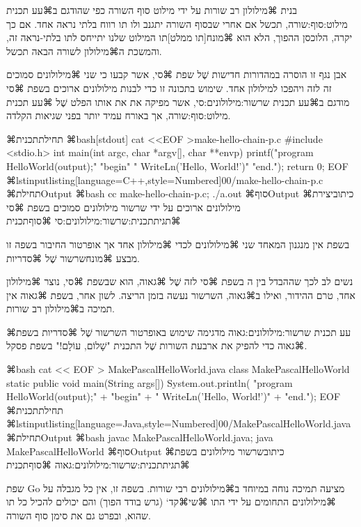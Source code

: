 בנית ⌘מילולון רב שורות על ידי מילוט סוף השורה כפי שהודגם ב⌘עע תכנית
מילוט:סוף:שורה, תכשל אם אחרי  שבסוף השורה יתגנב ולו
תו רווח בלתי נראה אחד. אם כך יקרה, הלוכסן ההפוך, הלא הוא
⌘מונח[תו ממלט]{תו המילוט} שלנו יתייחס לתו בלתי-נראה זה,
והמשכת ה⌘מילולון לשורה הבאה תכשל.

אבן נגף זו הוסרה במהדורות חדישות שֶׁל שפת ⌘סי, אשר קבעו כי שני ⌘מילולונים סמוכים
 זה לזה ויהפכו למילולון אחד. שימוש בתכונה זו כדי לבנות
מילולונים ארוכים בשפת ⌘סי מודגם ב⌘עע תכנית שרשור:מילולונים:סי, אשר מפיקה את
את אותו הפלט שֶׁל ⌘עע תכנית מילוט:סוף:שורה, אך באורח עמיד יותר בפני שגיאות הקלדה.

⌘תחילת{תכנית}
⌘bash[stdout]
cat <<EOF >make-hello-chain-p.c
#include <stdio.h>
int main(int argc, char *argv[], char **envp) {
  printf("program HelloWorld(output);\n"
  "begin\n"
  " WriteLn('Hello, World!')\n"
  "end.\n");
  return 0;
}
EOF
\END
\setLTR
⌘lstinputlisting[language=C++,style=Numbered]{00/make-hello-chain-p.c}
⌘תחילת{Output}
⌘bash
cc make-hello-chain-p.c; ./a.out
\END
⌘סוף{Output}\setRTL
⌘כיתוב{יצירת מילולונים ארוכים על ידי שרשור מילולונים סמוכים בשפת ⌘סי}
⌘תגית{תכנית:שרשור:מילולונים:סי}
⌘סוף{תכנית}

בשפת  אין מנגנון המאחד שני ⌘מילולונים לכדי ⌘מילולון אחד אך אופרטור
החיבור בשפה זו מבצע ⌘מונח{שרשור} שֶׁל ⌘סדריות.

נשים לב לכך שההבדל בין ה בשפת ⌘סי לזה שֶׁל ⌘גאוה, הוא שבשפת ⌘סי,
נוצר ⌘מילולון אחד, טרם ההידור, ואילו ב⌘גאוה, השרשור נעשה בזמן הריצה. לשון
אחר, בשפת ⌘גאוה אין תמיכה ב⌘מילולון רב שורות.

⌘עע תכנית שרשור:מילולונים:גאוה מדגימה שימוש באופרטור השרשור שֶׁל ⌘סדריות בשפת
⌘גאוה כדי להפיק את ארבעת השורות שֶׁל התכנית "שָׁלוֹם, עוֹלָם!" בשפת פסקל.

⌘bash
cat << EOF > MakePascalHelloWorld.java
class MakePascalHelloWorld {
  static public void main(String args[]) {
    System.out.println(
    "program HelloWorld(output);\n" +
    "begin\n" +
    " WriteLn('Hello, World!')\n" +
    "end.\n"); }}
EOF
\END
⌘תחילת{תכנית}
\setLTR
⌘lstinputlisting[language=Java,style=Numbered]{00/MakePascalHelloWorld.java}
⌘תחילת{Output}
⌘bash
javac MakePascalHelloWorld.java; java MakePascalHelloWorld
\END
⌘סוף{Output}\setRTL
⌘כיתוב{שרשור מילולונים בשפת }
⌘תגית{תכנית:שרשור:מילולונים:גאוה}
⌘סוף{תכנית}

שפת Go מציעה תמיכה נוחה במיוחד ב⌘מילולונים רבי שורות. בשפה זו, אין כל מגבלה על
⌘מילולונים התחומים על ידי התו ⌘שי{⌘קד{`}} (גרש בודד הפוך) והם יכולים להכיל
כל תו שהוא, ובפרט גם את סימן סוף השורה.

